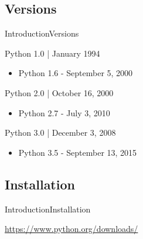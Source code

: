 \documentclass[10pt]{beamer}
\begin{document}
\subsection{Versions}
\begin{frame}{Introduction}{Versions}
\begin{block}{Python 1.0 | January 1994}
\begin{itemize}
	\item Python 1.6 - September 5, 2000
\end{itemize}
\end{block}	

\begin{block}{Python 2.0 | October 16, 2000}
	\begin{itemize}
		\item Python 2.7 - July 3, 2010
	\end{itemize}
\end{block}

\begin{block}{Python 3.0 | December 3, 2008}
	\begin{itemize}
		\item Python 3.5 - September 13, 2015
	\end{itemize}
\end{block}
\end{frame}
 		
 \subsection{Installation}
 \begin{frame}{Introduction}{Installation}
 		
 \url{https://www.python.org/downloads/}
 			
 \end{frame}
 		

 		 

 		 
\end{document}

